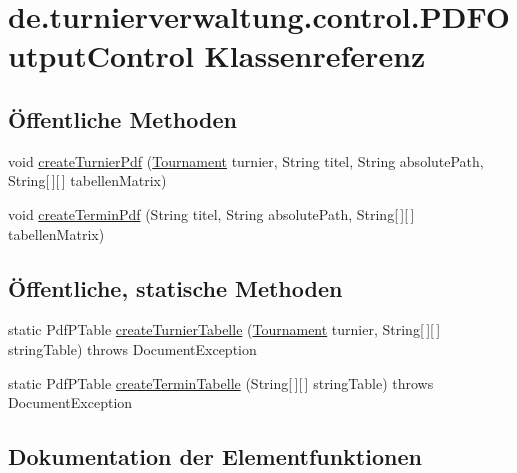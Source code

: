 \hypertarget{classde_1_1turnierverwaltung_1_1control_1_1_p_d_f_output_control}{}\section{de.\+turnierverwaltung.\+control.\+P\+D\+F\+Output\+Control Klassenreferenz}
\label{classde_1_1turnierverwaltung_1_1control_1_1_p_d_f_output_control}
\subsection*{Öffentliche Methoden}
\begin{DoxyCompactItemize}
\item 
void \hyperlink{classde_1_1turnierverwaltung_1_1control_1_1_p_d_f_output_control_ac1d5488b69fc57f66800b73ce8964dfe}{create\+Turnier\+Pdf} (\hyperlink{classde_1_1turnierverwaltung_1_1model_1_1_tournament}{Tournament} turnier, String titel, String absolute\+Path, String\mbox{[}$\,$\mbox{]}\mbox{[}$\,$\mbox{]} tabellen\+Matrix)
\item 
void \hyperlink{classde_1_1turnierverwaltung_1_1control_1_1_p_d_f_output_control_a5e6f38bc020570bcd323c31966592fc9}{create\+Termin\+Pdf} (String titel, String absolute\+Path, String\mbox{[}$\,$\mbox{]}\mbox{[}$\,$\mbox{]} tabellen\+Matrix)
\end{DoxyCompactItemize}
\subsection*{Öffentliche, statische Methoden}
\begin{DoxyCompactItemize}
\item 
static Pdf\+P\+Table \hyperlink{classde_1_1turnierverwaltung_1_1control_1_1_p_d_f_output_control_a0638b25e6c95da2cce713f0d34e4d8ac}{create\+Turnier\+Tabelle} (\hyperlink{classde_1_1turnierverwaltung_1_1model_1_1_tournament}{Tournament} turnier, String\mbox{[}$\,$\mbox{]}\mbox{[}$\,$\mbox{]} string\+Table)  throws Document\+Exception 
\item 
static Pdf\+P\+Table \hyperlink{classde_1_1turnierverwaltung_1_1control_1_1_p_d_f_output_control_a8869aac281b4d4f6a6dae488006069d1}{create\+Termin\+Tabelle} (String\mbox{[}$\,$\mbox{]}\mbox{[}$\,$\mbox{]} string\+Table)  throws Document\+Exception 
\end{DoxyCompactItemize}


\subsection{Dokumentation der Elementfunktionen}
